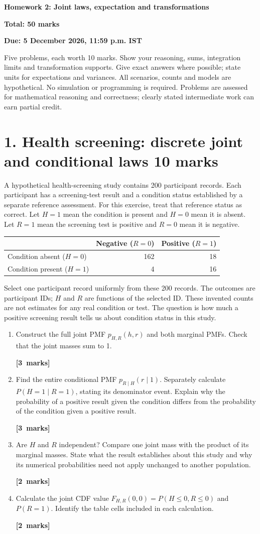 \documentclass[11pt,a4paper]{article}
\newcommand{\pts}[1]{\par\nobreak\hfill\mbox{\textbf{[#1 marks]}}}
\begin{document}
{\Large\bfseries Homework 2: Joint laws, expectation and transformations}\par
\textbf{Total: 50 marks}\par
\textbf{Due: 5 December 2026, 11:59 p.m. IST}

Five problems, each worth 10 marks. Show your reasoning, sums, integration limits and transformation supports. Give exact answers where possible; state units for expectations and variances. All scenarios, counts and models are hypothetical. No simulation or programming is required. Problems are assessed for mathematical reasoning and correctness; clearly stated intermediate work can earn partial credit.

\section*{1. Health screening: discrete joint and conditional laws \hfill 10 marks}
A hypothetical health-screening study contains 200 participant records. Each participant has a screening-test result and a condition status established by a separate reference assessment. For this exercise, treat that reference status as correct. Let $H=1$ mean the condition is present and $H=0$ mean it is absent. Let $R=1$ mean the screening test is positive and $R=0$ mean it is negative.
\begin{center}\begin{tabular}{lrr}\toprule
& Negative ($R=0$) & Positive ($R=1$)\\\midrule
Condition absent ($H=0$) & 162 & 18\\
Condition present ($H=1$) & 4 & 16\\\bottomrule
\end{tabular}\end{center}
Select one participant record uniformly from these 200 records. The outcomes are participant IDs; $H$ and $R$ are functions of the selected ID. These invented counts are not estimates for any real condition or test. The question is how much a positive screening result tells us about condition status in this study.
\begin{enumerate}
\item Construct the full joint PMF $p_{H,R}(h,r)$ and both marginal PMFs. Check that the joint masses sum to 1. \pts{3}
\item Find the entire conditional PMF $p_{R\mid H}(r\mid1)$. Separately calculate $P(H=1\mid R=1)$, stating its denominator event. Explain why the probability of a positive result given the condition differs from the probability of the condition given a positive result. \pts{3}
\item Are $H$ and $R$ independent? Compare one joint mass with the product of its marginal masses. State what the result establishes about this study and why its numerical probabilities need not apply unchanged to another population. \pts{2}
\item Calculate the joint CDF value $F_{H,R}(0,0)=P(H\le0,R\le0)$ and $P(R=1)$. Identify the table cells included in each calculation. \pts{2}
\end{enumerate}
\end{document}
